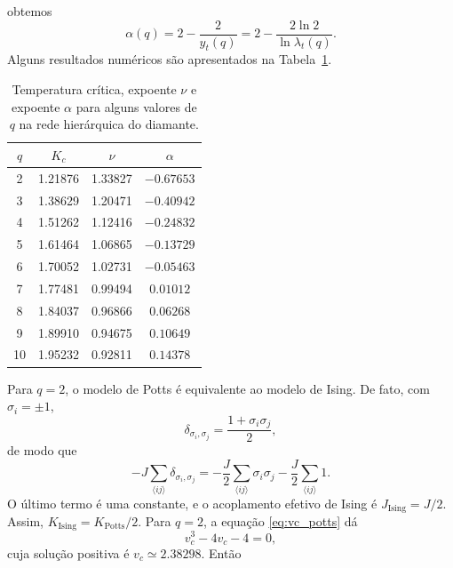 \documentclass[12pt,a4paper]{article}
\begin{document}
%
obtemos
%
\begin{equation}
    \boxed{
    \alpha(q)
    =
    2-\frac{2}{y_t(q)}
    =
    2-\frac{2\ln 2}{\ln\lambda_t(q)}.
    }
    \label{eq:alpha_q}
\end{equation}
% 
Alguns resultados numéricos são apresentados na
Tabela~\ref{tab:potts_values}.
%
\begin{table}[H]
    \centering
    \caption{
        Temperatura crítica, expoente \(\nu\) e expoente \(\alpha\)
        para alguns valores de \(q\) na rede hierárquica do diamante.
    }
    \label{tab:potts_values}
    \begin{tabular}{cccc}
        \toprule
        \(q\) & \(K_c\) & \(\nu\) & \(\alpha\) \\
        \midrule
        2 & 1.21876 & 1.33827 & $-0.67653$ \\
        3 & 1.38629 & 1.20471 & $-0.40942$ \\
        4 & 1.51262 & 1.12416 & $-0.24832$ \\
        5 & 1.61464 & 1.06865 & $-0.13729$ \\
        6 & 1.70052 & 1.02731 & $-0.05463$ \\
        7 & 1.77481 & 0.99494 & $0.01012$ \\
        8 & 1.84037 & 0.96866 & $0.06268$ \\
        9 & 1.89910 & 0.94675 & $0.10649$ \\
        10 & 1.95232 & 0.92811 & $0.14378$ \\
        \bottomrule
    \end{tabular}
\end{table}
%
Para \(q=2\), o modelo de Potts é equivalente ao modelo de Ising.
De fato, com \(\sigma_i=\pm1\),
%
\begin{equation}
    \delta_{\sigma_i,\sigma_j}
    =
    \frac{1+\sigma_i\sigma_j}{2},
\end{equation}
%
de modo que
%
\begin{equation}
    -J\sum_{\langle ij\rangle}\delta_{\sigma_i,\sigma_j}
    =
    -\frac{J}{2}\sum_{\langle ij\rangle}\sigma_i\sigma_j
    -
    \frac{J}{2}\sum_{\langle ij\rangle}1.
\end{equation}
%
O último termo é uma constante, e o acoplamento efetivo de Ising é
\(J_{\mathrm{Ising}}=J/2\). Assim, \(K_{\mathrm{Ising}}=K_{\mathrm{Potts}}/2\).
Para \(q=2\), a equação \eqref{eq:vc_potts} dá
%
\begin{equation}
    v_c^3-4v_c-4=0,
\end{equation}
%
cuja solução positiva é \(v_c\simeq2.38298\). Então
\end{document}
